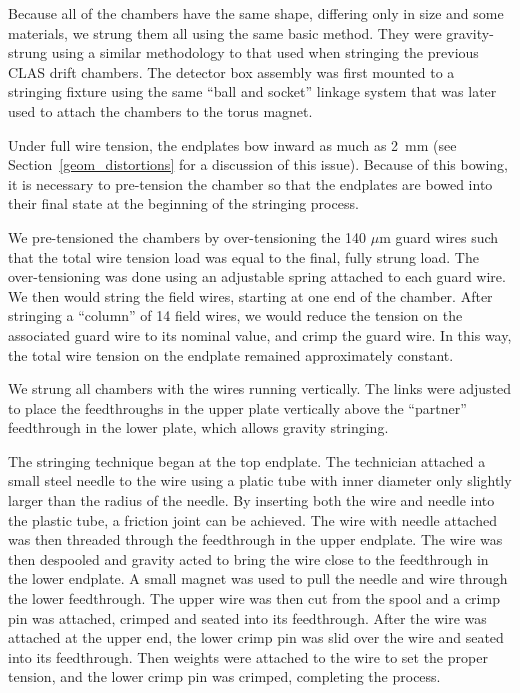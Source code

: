 Because all of the chambers have the same shape, differing only in
size and some materials, we strung them all using the same basic method.
They were gravity-strung using a similar methodology to that 
used when stringing the previous CLAS drift chambers.  The detector box 
assembly was first mounted to a stringing fixture using the same
``ball and socket'' linkage system that was later used to attach the
chambers to the torus magnet.  

Under full wire tension, the endplates bow inward as much as 2~mm 
(see Section~\ref{geom_distortions} for a discussion of this issue).
Because of this bowing, it is necessary to pre-tension the chamber
so that the endplates are bowed into their final state at the 
beginning of the stringing process.

We pre-tensioned the chambers by over-tensioning the 140 $\mu$m guard
wires such that the total wire tension load was equal to the final, 
fully strung load.  The over-tensioning was done using an adjustable
spring attached to each guard wire. 
We then would string the field wires, starting at one end of the chamber.
After stringing a ``column'' of 14 field wires, we would reduce the
tension on the associated guard wire to its nominal value, and crimp
the guard wire.  In this way, the total wire tension on the endplate
remained approximately constant.

We strung all chambers with 
the wires running vertically.  The links were adjusted to place the 
feedthroughs in the upper plate vertically above the ``partner''
feedthrough in the lower plate, which allows gravity stringing.

The stringing technique began at the top endplate.  The technician attached a 
small steel needle to the wire using a platic tube with inner diameter only
slightly larger than the radius of the needle.  By inserting both the wire and
needle into the plastic tube, a friction joint can be achieved.  
The wire with needle attached was then threaded through the feedthrough in 
the upper endplate.  The wire was then despooled and gravity acted to bring the 
wire close to the feedthrough in the lower endplate.  A small magnet was 
used to pull the needle and wire through the lower feedthrough.  The upper wire
was then cut from the spool and a crimp pin was attached, crimped and seated into
its feedthrough.  After the wire was attached at the upper end, the lower 
crimp pin was slid over the wire and seated into its feedthrough.  Then 
weights were attached to the wire to set the 
proper tension, and the lower crimp pin was crimped, completing the process.

